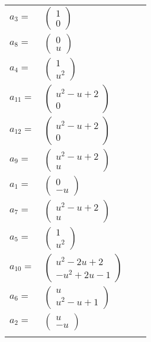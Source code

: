 \documentclass[1p]{elsarticle_modified}
\theoremstyle{definition}
\begin{document}
\begin{tabular}{m{7pt} m{180pt} m{7pt} m{180pt} }
\flushright $a_{3}=$&$\begin{pmatrix}1\\0\end{pmatrix}$ \\
\flushright $a_{8}=$&$\begin{pmatrix}0\\u\end{pmatrix}$ \\
\flushright $a_{4}=$&$\begin{pmatrix}1\\u^2\end{pmatrix}$ \\
\flushright $a_{11}=$&$\begin{pmatrix}u^2- u+2\\0\end{pmatrix}$ \\
\flushright $a_{12}=$&$\begin{pmatrix}u^2- u+2\\0\end{pmatrix}$ \\
\flushright $a_{9}=$&$\begin{pmatrix}u^2- u+2\\u\end{pmatrix}$ \\
\flushright $a_{1}=$&$\begin{pmatrix}0\\- u\end{pmatrix}$ \\
\flushright $a_{7}=$&$\begin{pmatrix}u^2- u+2\\u\end{pmatrix}$ \\
\flushright $a_{5}=$&$\begin{pmatrix}1\\u^2\end{pmatrix}$ \\
\flushright $a_{10}=$&$\begin{pmatrix}u^2-2 u+2\\- u^2+2 u-1\end{pmatrix}$ \\
\flushright $a_{6}=$&$\begin{pmatrix}u\\u^2- u+1\end{pmatrix}$ \\
\flushright $a_{2}=$&$\begin{pmatrix}u\\- u\end{pmatrix}$\\&\end{tabular}
\end{document}
